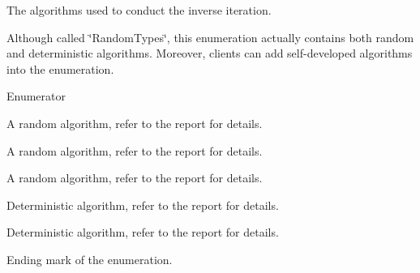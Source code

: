 The algorithms used to conduct the inverse iteration. 

Although called \char`\"{}\+Random\+Types\char`\"{}, this enumeration actually contains both random and deterministic algorithms. Moreover, clients can add self-\/developed algorithms into the enumeration. \begin{Desc}
\item[Enumerator]\par
\begin{description}
\item[{\em 
\hypertarget{class_iterator_a68bc1c5e7ad39ed78690beaa8a607430a1376e2aba7a2d8ff9240ed369a5bc08b}{Q\+U\+A\+D\+R\+A\+T\+I\+C}\label{class_iterator_a68bc1c5e7ad39ed78690beaa8a607430a1376e2aba7a2d8ff9240ed369a5bc08b}
}]A random algorithm, refer to the report for details. \item[{\em 
\hypertarget{class_iterator_a68bc1c5e7ad39ed78690beaa8a607430a44ed6f57f51bfc11730908f722fdbb5f}{U\+N\+I\+F\+O\+R\+M}\label{class_iterator_a68bc1c5e7ad39ed78690beaa8a607430a44ed6f57f51bfc11730908f722fdbb5f}
}]A random algorithm, refer to the report for details. \item[{\em 
\hypertarget{class_iterator_a68bc1c5e7ad39ed78690beaa8a607430aad4185989c35b8c829dcafe0522ac05d}{C\+U\+B\+I\+C}\label{class_iterator_a68bc1c5e7ad39ed78690beaa8a607430aad4185989c35b8c829dcafe0522ac05d}
}]A random algorithm, refer to the report for details. \item[{\em 
\hypertarget{class_iterator_a68bc1c5e7ad39ed78690beaa8a607430a0df1706a866c50be36b9fe29db81af26}{M\+A\+X\+I\+M\+U\+M}\label{class_iterator_a68bc1c5e7ad39ed78690beaa8a607430a0df1706a866c50be36b9fe29db81af26}
}]Deterministic algorithm, refer to the report for details. \item[{\em 
\hypertarget{class_iterator_a68bc1c5e7ad39ed78690beaa8a607430ac26704076bf61ec7a63ef3ece6440a05}{O\+P\+T\+I\+M\+A\+L}\label{class_iterator_a68bc1c5e7ad39ed78690beaa8a607430ac26704076bf61ec7a63ef3ece6440a05}
}]Deterministic algorithm, refer to the report for details. \item[{\em 
\hypertarget{class_iterator_a68bc1c5e7ad39ed78690beaa8a607430a6a17018cada1b3e646688ff845888f8d}{D\+E\+F\+A\+U\+L\+T}\label{class_iterator_a68bc1c5e7ad39ed78690beaa8a607430a6a17018cada1b3e646688ff845888f8d}
}]Ending mark of the enumeration. \end{description}
\end{Desc}



